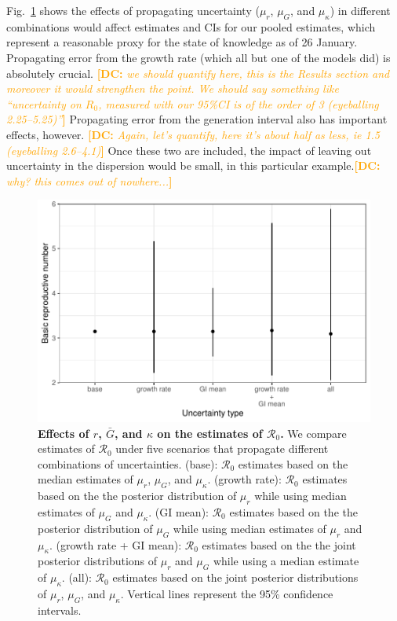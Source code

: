\documentclass[12pt]{article}
\newcommand{\fref}[1]{Fig.~\ref{fig:#1}}
\newcommand{\comment}[3]{\textcolor{#1}{\textbf{[#2: }\textsl{#3}\textbf{]}}}
\newcommand{\dc}[1]{\comment{Orange}{DC}{#1}}
\begin{document}
\fref{eff} shows the effects of propagating uncertainty ($\mu_r$, $\mu_G$, and $\mu_\kappa$) in different combinations would affect estimates and CIs for our pooled estimates, which represent a reasonable proxy for the state of knowledge as of 26 January. 
Propagating error from the growth rate (which all but one of the models did) is absolutely crucial. \dc{we should quantify here, this is the Results section and moreover it would strengthen the point. We should say something like ``uncertainty on $R_0$, measured with our 95\%CI is of the order of 3 (eyeballing 2.25--5.25)''}
Propagating error from the generation interval also has important effects, however.
\dc{Again, let's quantify, here it's about half as less, ie 1.5 (eyeballing 2.6--4.1)}
Once these two are included, the impact of leaving out uncertainty in the dispersion would be small, in this particular example.\dc{why? this comes out of  nowhere...}


\begin{figure}[!ht]
\includegraphics[width=\textwidth]{figure2.pdf}
\caption{
\textbf{Effects of $r$, $\bar G$, and $\kappa$ on the estimates of $\mathcal R_0$.}
We compare estimates of $\mathcal R_0$ under five scenarios that propagate different combinations of uncertainties.
(base): $\mathcal R_0$ estimates based on the median estimates of $\mu_r$, $\mu_G$, and $\mu_\kappa$.
(growth rate): $\mathcal R_0$ estimates based on the the posterior distribution of $\mu_r$ while using median estimates of $\mu_G$ and $\mu_\kappa$.
(GI mean): $\mathcal R_0$ estimates based on the the posterior distribution of $\mu_G$ while using median estimates of $\mu_r$ and $\mu_\kappa$.
(growth rate + GI mean): $\mathcal R_0$ estimates based on the the joint posterior distributions of $\mu_r$ and $\mu_G$ while using a median estimate of $\mu_\kappa$.
(all): $\mathcal R_0$ estimates based on the joint posterior distributions of  $\mu_r$, $\mu_G$, and $\mu_\kappa$.
Vertical lines represent the 95\% confidence intervals.
}
\label{fig:eff}
\end{figure}
\end{document}
